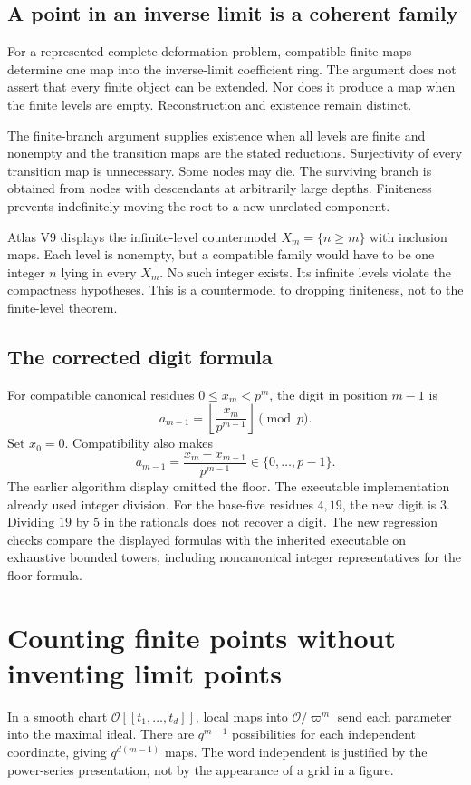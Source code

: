 \subsection{A point in an inverse limit is a coherent family}
For a represented complete deformation problem, compatible finite maps determine
one map into the inverse-limit coefficient ring. The argument does not assert
that every finite object can be extended. Nor does it produce a map when the
finite levels are empty. Reconstruction and existence remain distinct.

The finite-branch argument supplies existence when all levels are finite and
nonempty and the transition maps are the stated reductions. Surjectivity of every
transition map is unnecessary. Some nodes may die. The surviving branch is
obtained from nodes with descendants at arbitrarily large depths. Finiteness
prevents indefinitely moving the root to a new unrelated component.

Atlas V9 displays the infinite-level countermodel $X_m=\{n\ge m\}$ with inclusion
maps. Each level is nonempty, but a compatible family would have to be one integer
$n$ lying in every $X_m$. No such integer exists. Its infinite levels violate the
compactness hypotheses. This is a countermodel to dropping finiteness, not to the
finite-level theorem.

\subsection{The corrected digit formula}
For compatible canonical residues $0\le x_m<p^m$, the digit in position $m-1$ is
\[
 a_{m-1}=\left\lfloor\frac{x_m}{p^{m-1}}\right\rfloor\pmod p.
\]
Set $x_0=0$. Compatibility also makes
\[
 a_{m-1}=\frac{x_m-x_{m-1}}{p^{m-1}}\in\{0,\ldots,p-1\}.
\]
The earlier algorithm display omitted the floor. The executable implementation
already used integer division. For the base-five residues $4,19$, the new digit
is $3$. Dividing $19$ by $5$ in the rationals does not recover a digit. The new
regression checks compare the displayed formulas with the inherited executable
on exhaustive bounded towers, including noncanonical integer representatives
for the floor formula.

\clearpage
\section{Counting finite points without inventing limit points}
In a smooth chart $\mathcal O[[t_1,\ldots,t_d]]$, local maps into
$\mathcal O/\varpi^m$ send each parameter into the maximal ideal. There are
$q^{m-1}$ possibilities for each independent coordinate, giving
$q^{d(m-1)}$ maps. The word independent is justified by the power-series
presentation, not by the appearance of a grid in a figure.

